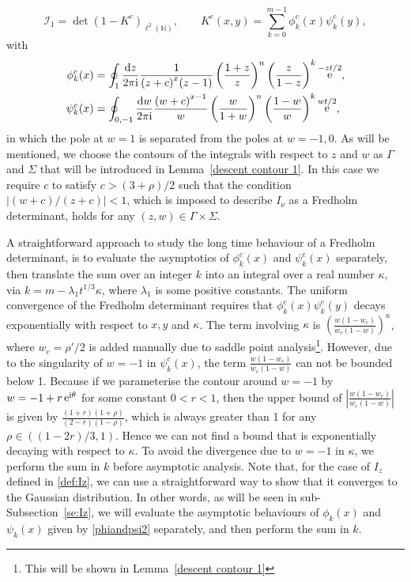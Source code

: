 \documentclass[cmp]{svjour}
\numberwithin{theorem}{section}
\numberwithin{equation}{section}
\DeclareMathOperator{\e}{e}
\def\dd{{\rm d}}
\def\ii{{\rm i}}
\begin{document}
\begin{equation}
\mathcal{I}_1 = \det(1-K^c)_{\ell^2(\mathbb{N})},\qquad K^c(x,y)=\sum_{k=0}^{m-1} \phi^c_k(x) \psi^c_k(y),
\label{eq:fredholm1}
\end{equation}
with
\begin{subequations}
\label{phipsiform1}
\begin{align}
\phi^c_k(x) &= \oint_1 \frac{\dd z}{2\pi\ii} \frac{1}{ {(z+c)}^{x}  (z-1)} \left(\frac{1+z}{z}\right)^n \left(\frac{z}{1-z}\right)^k \e^{-zt/2} ,
\label{phiform1}
\\
\psi^c_k(x) &= \oint_{0,-1}\frac{\dd w}{2\pi\ii} \frac{  {(w+c)}^{x-1}  }{w} \left(\frac{w}{1+w}\right)^n \left(\frac{1-w}{w}\right)^{k} \e^{ wt/2},
\label{psiform1}
\end{align}
\end{subequations}
in which the pole at $w=1$ is separated from the poles at $w=-1,0$.
As will be mentioned, we choose the contours of the integrals with respect to $z$ and $w$ as $\Gamma$ and $\Sigma$ that will be introduced in Lemma~\ref{descent contour 1}.
In this case we require $c$ to satisfy $c > (3+ \rho )/2$ such that the condition $| (w+c)/(z+c) | < 1$, which is imposed to describe $I_\nu$ as a Fredholm determinant, holds for any $(z, w) \in \Gamma \times \Sigma$.


A straightforward approach to study the long time behaviour of a Fredholm determinant, is to evaluate the asymptotics of $\phi_k^c(x)$ and $\psi_k^c(x)$ separately, then translate the sum over an integer $k$ into an integral over a real number $\kappa$, via $k=m-\lambda_1t^{1/3}\kappa$, where $\lambda_1$ is some positive constants. The uniform convergence of the Fredholm determinant requires that $\phi_k^c(x)\psi_k^c(y)$ decays exponentially with respect to $x,y$ and $\kappa$. The term involving $\kappa$ is $\left(\frac{w(1-w_c)}{w_c(1-w)}\right)^\kappa$, where $w_c=\rho'/2$ is added manually due to saddle point analysis\footnote{This will be shown in Lemma~\ref{descent contour 1}}. However, due to the singularity of $w=-1$ in $\psi_k^c(x)$, the term $\frac{w(1-w_c)}{w_c(1-w)}$ can not be bounded below 1. Because if we parameterise the contour around $w=-1$ by $w=-1+r\e^{\ii \theta }$ for some constant $0<r<1$, then the upper bound of  $\left|\frac{w(1-w_c)}{w_c(1-w)}\right|$ is given by $\frac{(1+r)(1+\rho)}{(2-r)(1-\rho)}$, which is always greater than 1 for any  $\rho \in ((1-2r)/3,1)$. Hence we can not find a bound that is exponentially decaying with respect to $\kappa$. To avoid the divergence due to $w=-1$ in $\kappa$, we perform the sum in $k$ before asymptotic analysis. Note that, for the case of $I_z$ defined in \eqref{def:Iz}, we can use a straightforward way to show that it converges to the Gaussian distribution. In other words, as will be seen in sub-Subsection~\ref{se:Iz}, we will evaluate the asymptotic behaviours of $\phi_k(x)$ and $\psi_k(x)$ given by \eqref{phiandpsi2} separately, and then perform the sum in $k$.
\end{document}
